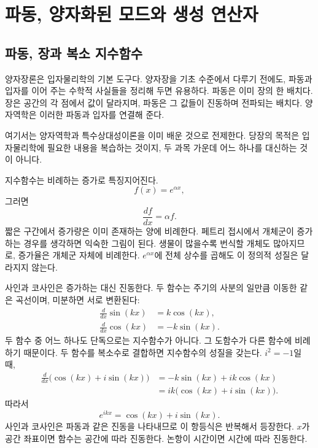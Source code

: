 \chapter{파동, 양자화된 모드와 생성 연산자}

\section{파동, 장과 복소 지수함수}

양자장론은 입자물리학의 기본 도구다. 양자장을 기초 수준에서 다루기 전에도, 파동과 입자를 이어 주는 수학적 사실들을 정리해 두면 유용하다. 파동은 이미 장의 한 배치다. 장은 공간의 각 점에서 값이 달라지며, 파동은 그 값들이 진동하며 전파되는 배치다. 양자역학은 이러한 파동과 입자를 연결해 준다.

여기서는 양자역학과 특수상대성이론을 이미 배운 것으로 전제한다. 당장의 목적은 입자물리학에 필요한 내용을 복습하는 것이지, 두 과목 가운데 어느 하나를 대신하는 것이 아니다.

지수함수는 비례하는 증가로 특징지어진다. \begin{equation}
f(x)=e^{\alpha x},
\end{equation}그러면 \begin{equation}
\frac{df}{dx}=\alpha f.
\end{equation}짧은 구간에서 증가량은 이미 존재하는 양에 비례한다. 페트리 접시에서 개체군이 증가하는 경우를 생각하면 익숙한 그림이 된다. 생물이 많을수록 번식할 개체도 많아지므로, 증가율은 개체군 자체에 비례한다. \(e^{\alpha x}\)에 전체 상수를 곱해도 이 정의적 성질은 달라지지 않는다.

사인과 코사인은 증가하는 대신 진동한다. 두 함수는 주기의 사분의 일만큼 이동한 같은 곡선이며, 미분하면 서로 변환된다:
\begin{align}
\frac{d}{dx}\sin(kx)&=k\cos(kx),\\
\frac{d}{dx}\cos(kx)&=-k\sin(kx).
\end{align}
두 함수 중 어느 하나도 단독으로는 지수함수가 아니다. 그 도함수가 다른 함수에 비례하기 때문이다. 두 함수를 복소수로 결합하면 지수함수의 성질을 갖는다. \(i^2=-1\)일 때,
\begin{align}
\frac{d}{dx}\bigl(\cos(kx)+i\sin(kx)\bigr)
&=-k\sin(kx)+ik\cos(kx)\\
&=ik\bigl(\cos(kx)+i\sin(kx)\bigr).
\end{align}
따라서
\begin{equation}
e^{ikx}=\cos(kx)+i\sin(kx).
\end{equation}
사인과 코사인은 파동과 같은 진동을 나타내므로 이 항등식은 반복해서 등장한다. \(x\)가 공간 좌표이면 함수는 공간에 따라 진동한다. 논항이 시간이면 시간에 따라 진동한다.

